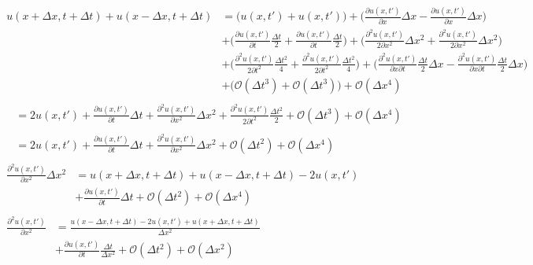 \documentclass{article}
\begin{document}
\begin{subequations}
	\begin{align}
		\begin{split}
		u(x+\Delta x, t+\Delta t) + u(x-\Delta x,t + \Delta t) &= 
		\Big(u(x,t') + u(x,t') \Big) + \Big(\frac{\partial u(x,t')}{\partial x}\Delta x-\frac{\partial u(x,t')}{\partial x}\Delta x\Big)\\ 
		&+ \Big(\frac{\partial u(x,t')}{\partial t} \frac{\Delta t}{2} +\frac{\partial u(x,t')}{\partial t} \frac{\Delta t}{2} \Big) + \Big(\frac{\partial^2 u(x,t')}{2\partial x^2}\Delta x^2+\frac{\partial^2 u(x,t')}{2\partial x^2}\Delta x^2\Big)\\
		& + \Big(\frac{\partial^2 u(x,t')}{2\partial t^2}\frac{\Delta t^2}{4} +\frac{\partial^2 u(x,t')}{2\partial t^2}\frac{\Delta t^2}{4} \Big) + \Big(\frac{\partial^2 u(x,t')}{\partial x\partial t}\frac{\Delta t}{2} \Delta x - \frac{\partial^2 u(x,t')}{\partial x\partial t}\frac{\Delta t}{2} \Delta x\Big)\\
		& + \Big(\mathcal{O}(\Delta t^3) + \mathcal{O}(\Delta t^3) \Big) + \mathcal{O}(\Delta x^4)
		\end{split}\\
		\begin{split}
			&=2u(x,t') + \frac{\partial u(x,t')}{\partial t} \Delta t
			+ \frac{\partial^2 u(x,t')}{\partial x^2}\Delta x^2
			 + \frac{\partial^2 u(x,t')}{2\partial t^2}\frac{\Delta t^2}{2}  
			 + \mathcal{O}(\Delta t^3) + \mathcal{O}(\Delta x^4)
		\end{split}\\
		\begin{split}
			&=2u(x,t') + \frac{\partial u(x,t')}{\partial t} \Delta t
			+ \frac{\partial^2 u(x,t')}{\partial x^2}\Delta x^2			
			+ \mathcal{O}(\Delta t^2) + \mathcal{O}(\Delta x^4)
		\end{split}\\	
		\begin{split}
		\frac{\partial^2 u(x,t')}{\partial x^2}\Delta x^2
		& = 
		u(x+\Delta x, t+\Delta t) + u(x-\Delta x,t + \Delta t) 
		- 2u(x,t') 
			\\ 
		&+\frac{\partial u(x,t')}{\partial t} \Delta t
		+  \mathcal{O}(\Delta t^2) + \mathcal{O}(\Delta x^4)
		\end{split}\\
		\begin{split}
			\frac{\partial^2 u(x,t')}{\partial x^2}
			&=\frac{u(x-\Delta x,t+ \Delta t)  - 2u(x,t') +  	u(x+\Delta x, t+\Delta t)}{\Delta x^2}\\
			& +\frac{\partial u(x,t')}{\partial t} \frac{\Delta t}{\Delta x^2} +\mathcal{O}(\Delta t^2) + \mathcal{O}(\Delta x^2)\label{eq:cnX2}
		\end{split}		
	\end{align}
\end{subequations}
\end{document}
